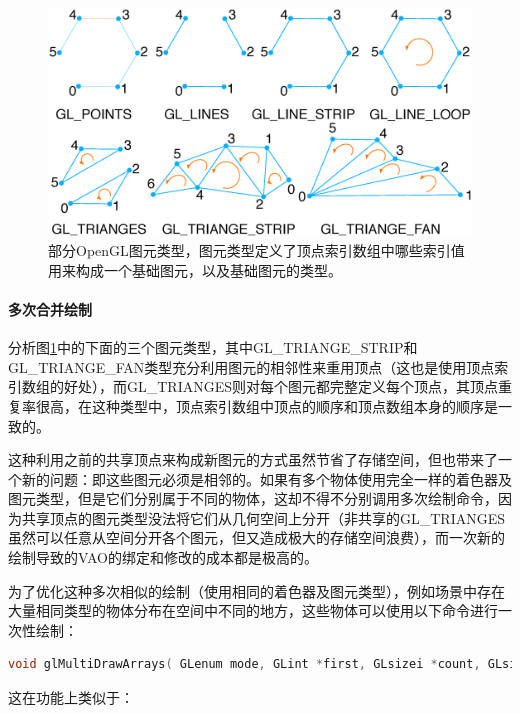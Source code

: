 \begin{figure}
	\includegraphics[width=\textwidth]{figures/api/primitives}
	\caption{部分OpenGL图元类型，图元类型定义了顶点索引数组中哪些索引值用来构成一个基础图元，以及基础图元的类型。}
	\label{f:api-primitives}
\end{figure}





\paragraph{多次合并绘制}
分析图\ref{f:api-primitives}中的下面的三个图元类型，其中GL\_TRIANGE\_STRIP和GL\_TRIANGE\_FAN类型充分利用图元的相邻性来重用顶点（这也是使用顶点索引数组的好处），而GL\_TRIANGES则对每个图元都完整定义每个顶点，其顶点重复率很高，在这种类型中，顶点索引数组中顶点的顺序和顶点数组本身的顺序是一致的。

这种利用之前的共享顶点来构成新图元的方式虽然节省了存储空间，但也带来了一个新的问题：即这些图元必须是相邻的。如果有多个物体使用完全一样的着色器及图元类型，但是它们分别属于不同的物体，这却不得不分别调用多次绘制命令，因为共享顶点的图元类型没法将它们从几何空间上分开（非共享的GL\_TRIANGES虽然可以任意从空间分开各个图元，但又造成极大的存储空间浪费），而一次新的绘制导致的VAO的绑定和修改的成本都是极高的。

为了优化这种多次相似的绘制（使用相同的着色器及图元类型），例如场景中存在大量相同类型的物体分布在空间中不同的地方，这些物体可以使用以下命令进行一次性绘制：

\begin{lstlisting}[language=C++]
void glMultiDrawArrays​( GLenum mode​, GLint *first​, GLsizei *count​, GLsizei primcount​);
\end{lstlisting}

这在功能上类似于：

